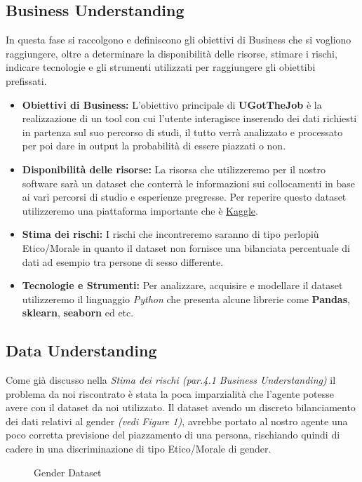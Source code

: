 \documentclass[12pt]{article}
\newcommand{\mainname}{UGotTheJob}
\begin{document}
\newpage

\subsection{Business Understanding}
In questa fase si raccolgono e definiscono gli obiettivi di Business che si vogliono raggiungere, oltre a determinare
la disponibilità delle risorse, stimare i rischi, indicare tecnologie e gli strumenti utilizzati per raggiungere gli obiettibi
prefissati.

\begin{itemize}
    \item \textbf{Obiettivi di Business:} L'obiettivo principale di \textbf{\mainname} è la realizzazione di un tool con cui l'utente interagisce inserendo
          dei dati richiesti in partenza sul suo percorso di studi, il tutto verrà analizzato e processato per poi dare in
          output la probabilità di essere piazzati o non.

    \item \textbf{Disponibilità delle risorse:} La risorsa che utilizzeremo per il nostro software sarà un dataset che conterrà
          le informazioni sui collocamenti in base ai vari percorsi di studio e esperienze pregresse. Per reperire questo dataset utilizzeremo una piattaforma importante che è \href{https://www.kaggle.com/}{Kaggle}.

    \item \textbf{Stima dei rischi:} I rischi che incontreremo saranno di tipo perlopiù Etico/Morale in quanto il dataset non fornisce una bilanciata percentuale di dati ad esempio tra persone di
          sesso differente.

    \item \textbf{Tecnologie e Strumenti:} Per analizzare, acquisire e modellare il dataset utilizzeremo il linguaggio \textit{Python} che presenta alcune librerie come \textbf{Pandas}, \textbf{sklearn}, \textbf{seaborn} ed etc.

\end{itemize}

\subsection{Data Understanding}
Come già discusso nella \textit{Stima dei rischi (par.4.1 Business Understanding)} il problema da noi riscontrato è stata la poca imparzialità che l'agente potesse avere
con il dataset da noi utilizzato. Il dataset avendo un discreto bilanciamento dei dati relativi al gender \textit{(vedi Figure 1)}, avrebbe portato al nostro agente una poco
corretta previsione del piazzamento di una persona, rischiando quindi di cadere in una discriminazione di tipo Etico/Morale di gender.
\begin{figure}[ht]
    \centering
    \caption{Gender Dataset}
    \label{fig:torta}
\end{figure}
\end{document}
